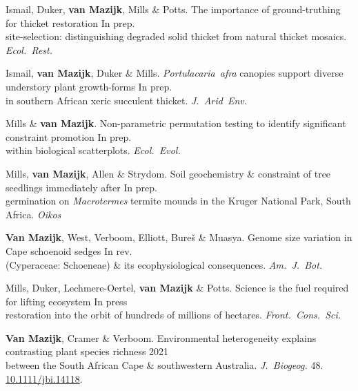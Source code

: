 Ismail, Duker, \textbf{van Mazijk}, Mills \& Potts.
The importance of ground-truthing for thicket restoration    \hfill In prep. \\
\hspace{2em} site-selection: distinguishing degraded solid thicket from natural thicket mosaics. \textit{Ecol.~Rest.}

Ismail, \textbf{van Mazijk}, Duker \& Mills.
\textit{Portulacaria~afra} canopies support diverse understory plant growth-forms
                                                              \hfill In prep. \\
\hspace{2em} in southern African xeric succulent thicket. \textit{J.~Arid~Env.}

Mills \& \textbf{van Mazijk}.
Non-parametric permutation testing to identify significant constraint promotion                                                     \hfill In prep. \\
\hspace{2em} within biological scatterplots.
  \textit{Ecol.~Evol.}

Mills, \textbf{van Mazijk}, Allen \& Strydom.
Soil geochemistry \& constraint of tree seedlings immediately after
                                                              \hfill In prep. \\
\hspace{2em} germination on \textit{Macrotermes} termite
  mounds in the Kruger National Park, South Africa.
  \textit{Oikos}

\textbf{Van Mazijk}, West, Verboom, Elliott, Bureš \& Muasya.
Genome size variation in Cape schoenoid sedges                \hfill In rev. \\
\hspace{2em} (Cyperaceae: Schoeneae) \& its ecophysiological consequences.
  \textit{Am.~J.~Bot.}

Mills, Duker, Lechmere-Oertel, \textbf{van Mazijk} \& Potts.
Science is the fuel required for lifting ecosystem             \hfill In press \\
\hspace{2em} restoration into the orbit of hundreds of millions of hectares.
  \textit{Front.~Cons.~Sci.}

\textbf{Van Mazijk}, Cramer \& Verboom.
Environmental heterogeneity explains contrasting plant species richness
                                                                  \hfill 2021 \\
\hspace{2em}
  between the South African Cape \& southwestern Australia.
  \textit{J.~Biogeog.}
  48. \href{https://doi.org/10.1111/jbi.14118}{10.1111/jbi.14118}.

